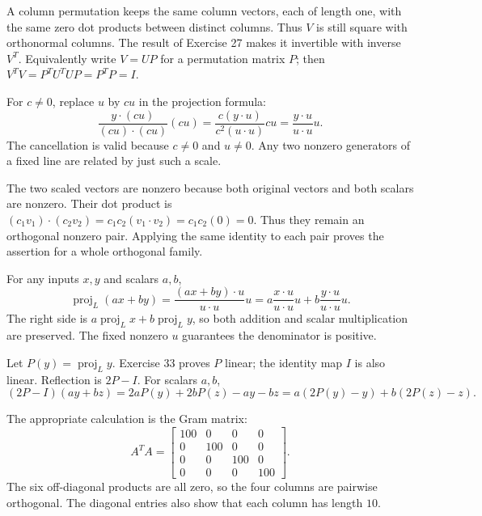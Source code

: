 A column permutation keeps the same column vectors, each of length
one, with the same zero dot products between distinct columns. Thus $V$
is still square with orthonormal columns. The result of Exercise 27
makes it invertible with inverse $V^T$.
Equivalently write $V=UP$ for a permutation matrix $P$; then
$V^TV=P^TU^TUP=P^TP=I$.

For $c\ne0$, replace $u$ by $cu$ in the projection formula:
\[
\frac{y\cdot(cu)}{(cu)\cdot(cu)}(cu)
=\frac{c(y\cdot u)}{c^2(u\cdot u)}cu
=\frac{y\cdot u}{u\cdot u}u.
\]
The cancellation is valid because $c\ne0$ and $u\ne0$. Any two
nonzero generators of a fixed line are related by just such a scale.

The two scaled vectors are nonzero because both original vectors and
both scalars are nonzero. Their dot product is
$(c_1v_1)\cdot(c_2v_2)=c_1c_2(v_1\cdot v_2)=c_1c_2(0)=0$.
Thus they remain an orthogonal nonzero pair. Applying the same identity
to each pair proves the assertion for a whole orthogonal family.

For any inputs $x,y$ and scalars $a,b$,
\[
\operatorname{proj}_L(ax+by)
=\frac{(ax+by)\cdot u}{u\cdot u}u
=a\frac{x\cdot u}{u\cdot u}u+b\frac{y\cdot u}{u\cdot u}u.
\]
The right side is $a\operatorname{proj}_Lx+b\operatorname{proj}_Ly$,
so both addition and scalar multiplication are preserved. The fixed
nonzero $u$ guarantees the denominator is positive.

Let $P(y)=\operatorname{proj}_Ly$. Exercise 33 proves $P$ linear;
the identity map $I$ is also linear. Reflection is $2P-I$.
For scalars $a,b$,
\[
(2P-I)(ay+bz)=2aP(y)+2bP(z)-ay-bz
=a(2P(y)-y)+b(2P(z)-z).
\]

The appropriate calculation is the Gram matrix:
\[A^TA=\left[\begin{array}{rrrr}100&0&0&0\\0&100&0&0\\0&0&100&0\\0&0&0&100\end{array}\right].\]
The six off-diagonal products are all zero, so the four columns are pairwise orthogonal. The diagonal entries also show that each column has length $10$.

